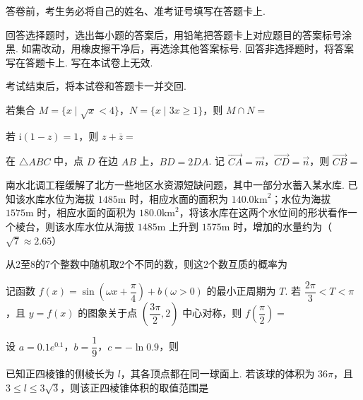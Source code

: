 \documentclass[a4paper,11pt]{report}
\begin{document}
\examfontsize



\noticetitle
\begin{examnotice}
\item 答卷前，考生务必将自己的姓名、准考证号填写在答题卡上. 
\item 回答选择题时，选出每小题的答案后，用铅笔把答题卡上对应题目的答案标号涂黑. 如需改动，用橡皮擦干净后，再选涂其他答案标号. 回答非选择题时，将答案写在答题卡上. 写在本试卷上无效. 
\item 考试结束后，将本试卷和答题卡一并交回. 
\end{examnotice}

\begin{examquestions}
\item 若集合 $M=\{x\mid \sqrt x<4\}$，$N=\{x\mid 3x\geq1\}$，则 $M\cap N=$
\item 若 $\mathrm{i}(1-z)=1$，则 $z+\overline z=$
\item 在 $\triangle ABC$ 中，点 $D$ 在边 $AB$ 上，$BD=2DA$. 记 $\overrightarrow{CA}=\vec m$，$\overrightarrow{CD}=\vec n$，则 $\overrightarrow{CB}=$
\item 南水北调工程缓解了北方一些地区水资源短缺问题，其中一部分水蓄入某水库. 已知该水库水位为海拔 $1485\mathrm{m}$ 时，相应水面的面积为 $140.0\mathrm{km}^2$；水位为海拔 $1575\mathrm{m}$ 时，相应水面的面积为 $180.0\mathrm{km}^2$，将该水库在这两个水位间的形状看作一个棱台，则该水库水位从海拔 $1485\mathrm{m}$ 上升到 $1575\mathrm{m}$ 时，增加的水量约为（$\sqrt7\approx2.65$）
\item 从2至8的7个整数中随机取2个不同的数，则这2个数互质的概率为
\item 记函数 $f(x)=\sin\left(\omega x+\dfrac\pi4\right)+b(\omega>0)$ 的最小正周期为 $T$. 若 $\dfrac{2\pi}{3}<T<\pi$，且 $y=f(x)$ 的图象关于点 $\left(\dfrac{3\pi}{2},2\right)$ 中心对称，则 $f\left(\dfrac\pi2\right)=$
\item 设 $a=0.1e^{0.1}$，$b=\dfrac19$，$c=-\ln0.9$，则
\item 已知正四棱锥的侧棱长为 $l$，其各顶点都在同一球面上. 若该球的体积为 $36\pi$，且 $3\leq l\leq3\sqrt3$，则该正四棱锥体积的取值范围是
\end{examquestions}
\end{document}

